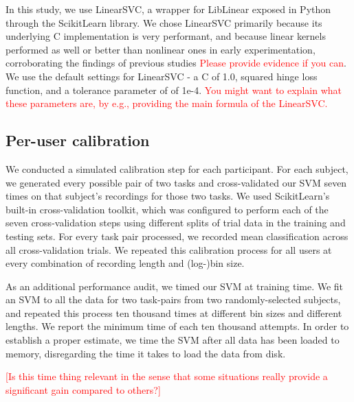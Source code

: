 In this study, we use LinearSVC, \cite{fan_liblinear:_2008} a wrapper for LibLinear exposed in Python through the ScikitLearn library. \cite{pedregosa_scikit-learn:_2011} We chose LinearSVC primarily because its underlying C implementation is very performant, and because linear kernels performed as well or better than nonlinear ones in early experimentation, corroborating the findings of previous studies \cite{garrett_comparison_2003,lotte_review_2007} \textcolor{red}{Please provide evidence if you can}.  We use the default settings for LinearSVC - a C of 1.0, squared hinge loss function, and a tolerance parameter of of 1e-4. \textcolor{red}{You might want to explain what these parameters are, by e.g., providing the main formula of the LinearSVC.}


\subsection{Per-user calibration}

We conducted a simulated calibration step for each participant. For each subject, we generated every possible pair of two tasks and cross-validated our SVM seven times on that subject's recordings for those two tasks. We used ScikitLearn's built-in cross-validation toolkit, which was configured to perform each of the seven cross-validation steps using different splits of trial data in the training and testing sets. For every task pair processed, we recorded mean classification across all cross-validation trials. We repeated this calibration process for all users at every combination of recording length and (log-)bin size. 

As an additional performance audit, we timed our SVM at training time. We fit an SVM to all the data for two task-pairs from two randomly-selected subjects, and repeated this process ten thousand times at different bin sizes and different lengths. We report the minimum time of each ten thousand attempts. In order to establish a proper estimate, we time the SVM after all data has been loaded to memory, disregarding the time it takes to load the data from disk.

\textcolor{red}{[Is this time thing relevant in the sense that some situations really provide a significant gain compared to others?]}


